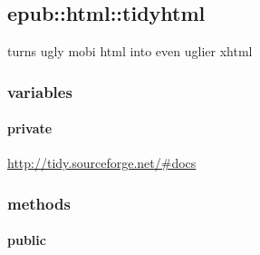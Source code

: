 \documentclass[letterpaper,10pt,english]{sphinxmanual}
\begin{document}
\subsection{epub::html::tidyhtml}
\label{tidyhtml:epub-html-tidyhtml}

\begin{fulllineitems}
\label{tidyhtml:epub::html::tidyhtml}
turns ugly mobi html into even uglier xhtml

\end{fulllineitems}



\subsubsection{variables}
\label{tidyhtml:variables}

\paragraph{private}
\label{tidyhtml:private}

\begin{fulllineitems}
\label{tidyhtml:epub::html::tidyhtml::tdoc__TidyDoc}
\href{http://tidy.sourceforge.net/\#docs}{http://tidy.sourceforge.net/\#docs}

\end{fulllineitems}



\subsubsection{methods}
\label{tidyhtml:methods}

\paragraph{public}
\label{tidyhtml:public}
\end{document}
